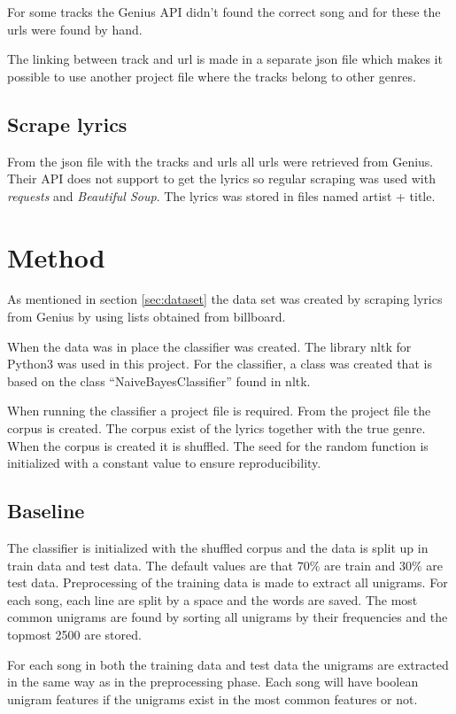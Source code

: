 \documentclass[a4paper, 12pt]{article}
\begin{document}
For some tracks the Genius API didn't found the correct song and for these the urls were found by hand.

The linking between track and url is made in a separate json file which makes it possible to use another project file where the tracks belong to other genres.

\subsection{Scrape lyrics}
From the json file with the tracks and urls all urls were retrieved from Genius.
Their API does not support to get the lyrics so regular scraping was used with \textit{requests} and \textit{Beautiful Soup}. 
The lyrics was stored in files named artist + title.

\section{Method}
As mentioned in section \ref{sec:dataset} the data set was created by scraping lyrics from Genius by using lists obtained from billboard.

When the data was in place the classifier was created.
The library nltk for Python3 was used in this project. 
For the classifier, a class was created that is based on the class ``NaiveBayesClassifier'' found in nltk.

When running the classifier a project file is required.
From the project file the corpus is created.
The corpus exist of the lyrics together with the true genre.
When the corpus is created it is shuffled.
The seed for the random function is initialized with a constant value to ensure reproducibility.

\subsection{Baseline}
\label{sec:baseline}
The classifier is initialized with the shuffled corpus and the data is split up in train data and test data.
The default values are that $70\%$ are train and $30\%$ are test data.
Preprocessing of the training data is made to extract all unigrams.
For each song, each line are split by a space and the words are saved.
The most common unigrams are found by sorting all unigrams by their frequencies and the topmost 2500 are stored.

For each song in both the training data and test data the unigrams are extracted in the same way as in the preprocessing phase.
Each song will have boolean unigram features if the unigrams exist in the most common features or not.
\end{document}
